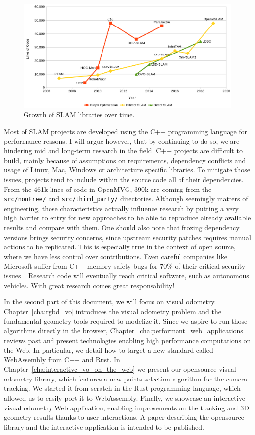 \begin{figure}[h]
	\centering
	\includegraphics[width=\linewidth]{assets/img/slam-cloc.png}
	\caption{Growth of SLAM libraries over time.}%
	\label{fig:assets/img/slam-cloc}
\end{figure}

Most of SLAM projects are developed using the C++ programming language for performance reasons.
I will argue however, that by continuing to do so, we are hindering mid and long-term research
in the field.
C++ projects are difficult to build, mainly because of assumptions on requirements,
dependency conflicts and usage of Linux, Mac, Windows or architecture specific libraries.
To mitigate those issues, projects tend to include within the source code all of their dependencies.
From the 461k lines of code in OpenMVG, 390k are coming from the \verb|src/nonFree/|
and \verb|src/third_party/| directories.
Although seemingly matters of engineering, those characteristics actually influence research
by putting a very high barrier to entry for new approaches to be able
to reproduce already available results and compare with them.
One should also note that frozing dependency versions brings security concerns,
since upstream security patches requires manual actions to be replicated.
This is especially true in the context of open source,
where we have less control over contributions.
Even careful companies like Microsoft suffer from C++ memory safety bugs
for 70\% of their critical security issues~\cite{msrc-safer}.
Research code will eventually reach critical software, such as autonomous vehicles.
With great research comes great responsability!

In the second part of this document, we will focus on visual odometry.
Chapter~\ref{cha:rgbd_vo} introduces the visual odometry problem
and the fundamental geometry tools required to modelize it.
Since we aspire to run those algorithms directly in the browser,
Chapter~\ref{cha:performant_web_applications} reviews past and present technologies
enabling high performance computations on the Web.
In particular, we detail how to target a new standard called WebAssembly from C++ and Rust.
In Chapter~\ref{cha:interactive_vo_on_the_web} we present our opensource visual odometry library,
which features a new points selection algorithm for the camera tracking.
We started it from scratch in the Rust programming language,
which allowed us to easily port it to WebAssembly.
Finally, we showcase an interactive visual odometry Web application,
enabling improvements on the tracking and 3D geometry results thanks to user interactions.
A paper describing the opensource library and the interactive application is intended to be published.
